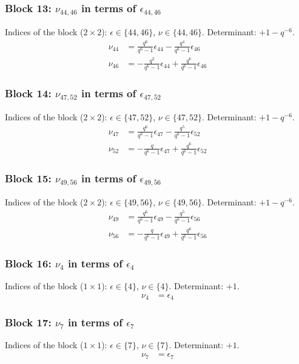 \subsubsection{Block 13: $\nu_{44, 46}$ in terms of $\epsilon_{44, 46}$}
Indices of the block ($2\times 2$): $\epsilon \in \{44, 46\}$, $\nu \in \{44, 46\}$.
Determinant: $+1-q^{-6}$.
\begin{align*}
\nu_{44} &= \frac{q^{6}}{q^{6}-1}\epsilon_{44} - \frac{q^{4}}{q^{6}-1}\epsilon_{46}\\
\nu_{46} &= -\frac{q^{2}}{q^{6}-1}\epsilon_{44} + \frac{q^{6}}{q^{6}-1}\epsilon_{46}
\end{align*}

\subsubsection{Block 14: $\nu_{47, 52}$ in terms of $\epsilon_{47, 52}$}
Indices of the block ($2\times 2$): $\epsilon \in \{47, 52\}$, $\nu \in \{47, 52\}$.
Determinant: $+1-q^{-6}$.
\begin{align*}
\nu_{47} &= \frac{q^{6}}{q^{6}-1}\epsilon_{47} - \frac{q^{5}}{q^{6}-1}\epsilon_{52}\\
\nu_{52} &= -\frac{q}{q^{6}-1}\epsilon_{47} + \frac{q^{6}}{q^{6}-1}\epsilon_{52}
\end{align*}

\subsubsection{Block 15: $\nu_{49, 56}$ in terms of $\epsilon_{49, 56}$}
Indices of the block ($2\times 2$): $\epsilon \in \{49, 56\}$, $\nu \in \{49, 56\}$.
Determinant: $+1-q^{-6}$.
\begin{align*}
\nu_{49} &= \frac{q^{6}}{q^{6}-1}\epsilon_{49} - \frac{q^{5}}{q^{6}-1}\epsilon_{56}\\
\nu_{56} &= -\frac{q}{q^{6}-1}\epsilon_{49} + \frac{q^{6}}{q^{6}-1}\epsilon_{56}
\end{align*}

\subsubsection{Block 16: $\nu_{4}$ in terms of $\epsilon_{4}$}
Indices of the block ($1\times 1$): $\epsilon \in \{4\}$, $\nu \in \{4\}$.
Determinant: $+1$.
\begin{align*}
\nu_{4} &= \epsilon_{4}
\end{align*}

\subsubsection{Block 17: $\nu_{7}$ in terms of $\epsilon_{7}$}
Indices of the block ($1\times 1$): $\epsilon \in \{7\}$, $\nu \in \{7\}$.
Determinant: $+1$.
\begin{align*}
\nu_{7} &= \epsilon_{7}
\end{align*}

